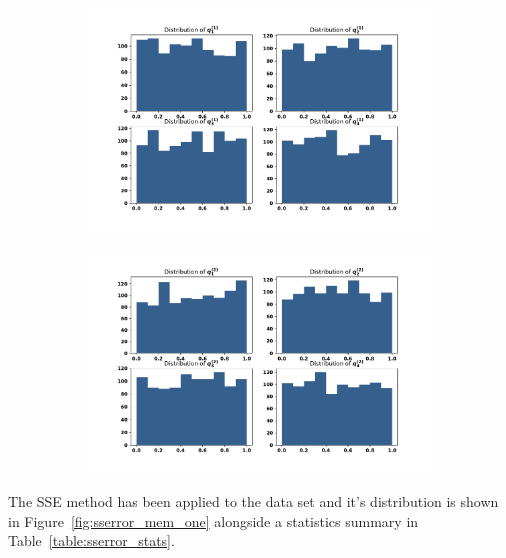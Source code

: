 \documentclass[10pt]{article}
\begin{document}
\begin{figure}[!htbp]
    \begin{subfigure}{0.49\textwidth}
        \centering
        \includegraphics[width=\linewidth]{img/first_opponent_probabilities.pdf}
        \label{fig:first_opponents_probabilities}
    \end{subfigure}
    \begin{subfigure}{0.49\textwidth}
        \centering
        \includegraphics[width=\linewidth]{img/second_opponent_probabilities.pdf}
        \label{fig:second_opponents_probabilities}
    \end{subfigure}
\end{figure}

The SSE method has been applied to the data set and it's distribution is
shown in Figure~\ref{fig:sserror_mem_one} alongside a statistics summary in
Table~\ref{table:sserror_stats}.
\end{document}
